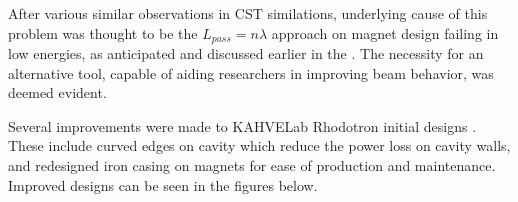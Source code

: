 \documentclass[a4paper,oneside,12pt]{report}
\numberwithin{equation}{chapter}
\begin{document}
After various similar observations in CST similations, underlying cause of this problem was thought to be the $L_{pass} = n \lambda$ approach on magnet design failing in low energies, 
as anticipated and discussed earlier in the .
The necessity for an alternative tool, capable of aiding researchers in improving beam behavior, was deemed evident.

Several improvements were made to KAHVELab Rhodotron initial designs \cite{sinan}. These include curved edges on cavity which reduce the power loss on cavity walls, and redesigned iron casing on magnets for ease of production and maintenance.
Improved designs can be seen in the figures below.

\end{document}
